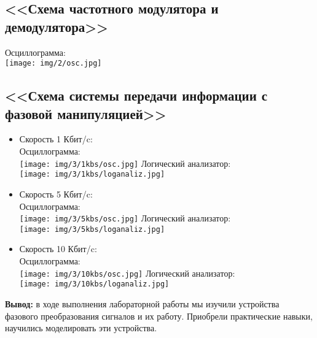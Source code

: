 \documentclass[11pt]{article}
\begin{document}
\subsection{<<Схема частотного модулятора и демодулятора>>}
Осциллограмма:\\
\texttt{[image: img/2/osc.jpg]}
\subsection{<<Схема системы передачи информации с фазовой манипуляцией>>}
\begin{itemize}
\item Скорость 1 Кбит/c:\\
Осциллограмма:\\
\texttt{[image: img/3/1kbs/osc.jpg]}
Логический анализатор:\\
\texttt{[image: img/3/1kbs/loganaliz.jpg]}
\item Скорость 5 Кбит/c:\\
Осциллограмма:\\
\texttt{[image: img/3/5kbs/osc.jpg]}
Логический анализатор:\\
\texttt{[image: img/3/5kbs/loganaliz.jpg]}
\item Скорость 10 Кбит/c:\\
Осциллограмма:\\
\texttt{[image: img/3/10kbs/osc.jpg]}
Логический анализатор:\\
\texttt{[image: img/3/10kbs/loganaliz.jpg]}
\end{itemize}
\textbf{Вывод:} в ходе выполнения лабораторной работы мы изучили устройства фазового преобразования сигналов и их работу. Приобрели практические навыки, научились моделировать эти устройства.
\end{document}
